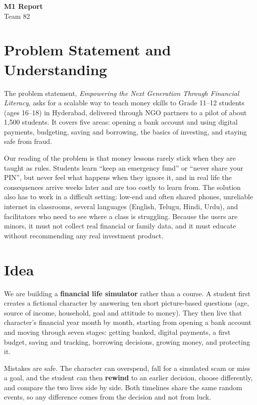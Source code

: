 \documentclass[11pt,a4paper]{article}
\begin{document}
\begin{center}
  {\LARGE\bfseries M1 Report}\\[6pt]
  {\large Team 82}
\end{center}
\vspace{4pt}

\section{Problem Statement and Understanding}

The problem statement, \emph{Empowering the Next Generation Through Financial Literacy}, asks for a scalable way to teach money skills to Grade 11--12 students (ages 16--18) in Hyderabad, delivered through NGO partners to a pilot of about 1,500 students. It covers five areas: opening a bank account and using digital payments, budgeting, saving and borrowing, the basics of investing, and staying safe from fraud.

Our reading of the problem is that money lessons rarely stick when they are taught as rules. Students learn ``keep an emergency fund'' or ``never share your PIN'', but never feel what happens when they ignore it, and in real life the consequences arrive weeks later and are too costly to learn from. The solution also has to work in a difficult setting: low-end and often shared phones, unreliable internet in classrooms, several languages (English, Telugu, Hindi, Urdu), and facilitators who need to see where a class is struggling. Because the users are minors, it must not collect real financial or family data, and it must educate without recommending any real investment product.

\section{Idea}

We are building a \textbf{financial life simulator} rather than a course. A student first creates a fictional character by answering ten short picture-based questions (age, source of income, household, goal and attitude to money). They then live that character's financial year month by month, starting from opening a bank account and moving through seven stages: getting banked, digital payments, a first budget, saving and tracking, borrowing decisions, growing money, and protecting it.

Mistakes are safe. The character can overspend, fall for a simulated scam or miss a goal, and the student can then \textbf{rewind} to an earlier decision, choose differently, and compare the two lives side by side. Both timelines share the same random events, so any difference comes from the decision and not from luck.
\end{document}
